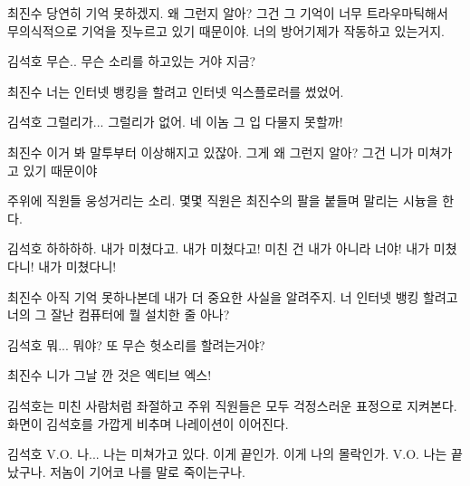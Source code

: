 \documentclass{screenplay}
\begin{document}
    \begin{dialogue}{최진수}
        당연히 기억 못하겠지. 왜 그런지 알아?
        그건 그 기억이 너무 트라우마틱해서 무의식적으로 기억을 짓누르고 있기 때문이야. 
        너의 방어기제가 작동하고 있는거지.
    \end{dialogue}
    \begin{dialogue}{김석호}
        무슨.. 무슨 소리를 하고있는 거야 지금?
    \end{dialogue}
    \begin{dialogue}{최진수}
        너는 인터넷 뱅킹을 할려고 인터넷 익스플로러를 썼었어.
    \end{dialogue}
    \begin{dialogue}{김석호}
        그럴리가... 그럴리가 없어. 네 이놈 그 입 다물지 못할까!
    \end{dialogue}
    \begin{dialogue}{최진수}
        이거 봐 말투부터 이상해지고 있잖아. 그게 왜 그런지 알아?
        그건 니가 미쳐가고 있기 때문이야
    \end{dialogue}
    주위에 직원들 웅성거리는 소리. 몇몇 직원은 최진수의 팔을 붙들며 말리는 시늉을 한다.
    \begin{dialogue}{김석호}
        하하하하. 내가 미쳤다고. 내가 미쳤다고!
        미친 건 내가 아니라 너야! 내가 미쳤다니! 내가 미쳤다니!
    \end{dialogue}
    \begin{dialogue}{최진수}
        아직 기억 못하나본데 내가 더 중요한 사실을 알려주지.
        너 인터넷 뱅킹 할려고 너의 그 잘난 컴퓨터에 뭘 설치한 줄 아나?
    \end{dialogue}
    \begin{dialogue}[두려워하며]{김석호}
        뭐... 뭐야? 또 무슨 헛소리를 할려는거야?
    \end{dialogue}
    \begin{dialogue}{최진수}
        니가 그날 깐 것은
        엑티브
        엑스!
    \end{dialogue}
    
    김석호는 미친 사람처럼 좌절하고 주위 직원들은 모두 걱정스러운 표정으로 지켜본다. 화면이 김석호를 가깝게 비추며 나레이션이 이어진다.
    \begin{dialogue}{김석호}
        V.O. 나... 나는 미쳐가고 있다. 이게 끝인가. 이게 나의 몰락인가.
        V.O. 나는 끝났구나. 저놈이 기어코 나를 말로 죽이는구나.
    \end{dialogue}
    
\end{document}
